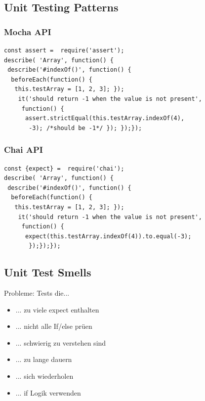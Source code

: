 \subsection{Unit Testing Patterns}



\subsubsection{Mocha API}
\begin{lstlisting}
const assert =  require('assert');
describe( 'Array', function() {
 describe('#indexOf()', function() {
  beforeEach(function() {
   this.testArray = [1, 2, 3]; });
    it('should return -1 when the value is not present',
     function() {
      assert.strictEqual(this.testArray.indexOf(4),
       -3); /*should be -1*/ }); });});
\end{lstlisting}

\subsubsection{Chai API}
\begin{lstlisting}
const {expect} =  require('chai');
describe( 'Array', function() {
 describe('#indexOf()', function() {
  beforeEach(function() {
   this.testArray = [1, 2, 3]; });
    it('should return -1 when the value is not present',
     function() {
      expect(this.testArray.indexOf(4)).to.equal(-3);
       });});});
\end{lstlisting}


\subsection{Unit Test Smells}
Probleme: Tests die...
\begin{itemize}
    \item ... zu viele expect enthalten
    \item ... nicht alle If/else prüen
    \item ... schwierig zu verstehen sind
    \item ... zu lange dauern
    \item ... sich wiederholen
    \item ... if Logik verwenden
\end{itemize}



\columnbreak








